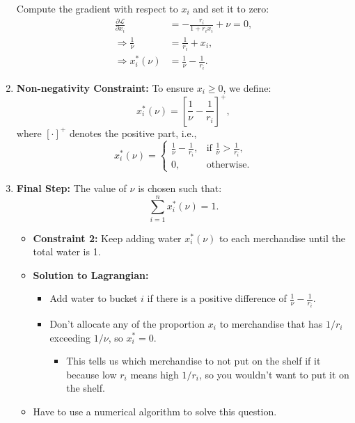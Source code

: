 \begin{example}
\begin{enumerate}
        Compute the gradient with respect to \(x_i\) and set it to zero:
        \begin{align*}
            \frac{\partial \mathcal{L}}{\partial x_i} &= -\frac{r_i}{1 + r_i x_i} + \nu = 0, \\
            \Rightarrow \frac{1}{\nu} &= \frac{1}{r_i} + x_i, \\
            \Rightarrow x_i^*(\nu) &= \frac{1}{\nu} - \frac{1}{r_i}.
        \end{align*}
    
        \item \textbf{Non-negativity Constraint:}
        To ensure \(x_i \geq 0\), we define:
        \[
        x_i^*(\nu) = \left[ \frac{1}{\nu} - \frac{1}{r_i} \right]^+,
        \]
        where \([\cdot]^+\) denotes the positive part, i.e.,
        \[
        x_i^*(\nu) = 
        \begin{cases} 
            \frac{1}{\nu} - \frac{1}{r_i}, & \text{if } \frac{1}{\nu} > \frac{1}{r_i}, \\
            0, & \text{otherwise}.
        \end{cases}
        \]
    
        \item \textbf{Final Step:}
        The value of \(\nu\) is chosen such that:
        \[
        \sum_{i=1}^n x_i^*(\nu) = 1.
        \]
        \begin{itemize}
            \item \textbf{Constraint 2:} Keep adding water $x_i^*(\nu)$ to each merchandise until the total water is 1.
            \item \textbf{Solution to Lagrangian:} 
            \begin{itemize}
                \item Add water to bucket $i$ if there is a positive difference of $\frac{1}{\nu} - \frac{1}{r_i}$.
                \item Don't allocate any of the proportion $x_i$ to merchandise that has $1/r_i$ exceeding $1/\nu$, so $x^*_i = 0$.
                \begin{itemize}
                    \item This tells us which merchandise to not put on the shelf if it because low $r_i$ means high $1/r_i$, so you wouldn't want to put it on the shelf.
                \end{itemize}
            \end{itemize}
            \item Have to use a numerical algorithm to solve this question.
        \end{itemize}
    \end{enumerate}    
\end{example}

